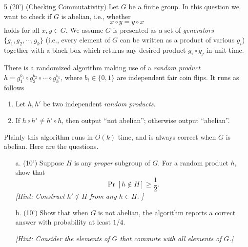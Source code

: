 
\begin{question}{5 (20') (Checking Commutativity)}
	Let $G$ be a finite group. In this question we want to check if $G$ is abelian, i.e., whether
	$$
	x\circ y=y\circ x
	$$
	holds for all $x,y\in G$. We assume $G$ is presented as a set of \textit{generators} $\{g_1,g_2,\cdots,g_k\}$ (i.e., every element of $G$ can be written as a product of various $g_i$) together with a black box which returns any desired product $g_i\circ g_j$ in unit time.
	
	There is a randomized algorithm making use of a \textit{random product} $h=g_1^{b_1}\circ g_2^{b_2}\circ\cdots\circ g_k^{b_k}$, where $b_i\in\{0,1\}$ are independent fair coin flips. It runs as follows
	\begin{enumerate}
		\item Let $h,h'$ be two independent \textit{random products}.
		\item If $h\circ h'\neq h'\circ h$, then output ``not abelian''; otherwise output ``abelian''.
	\end{enumerate}
	
	Plainly this algorithm runs in $O(k)$ time, and is always correct when $G$ is abelian. Here are the questions.
	\begin{itemize}
		\item[a. (10')] Suppose $H$ is any \textit{proper} subgroup of $G$. For a random product $h$, show that 
		$$
		\Pr[h\notin H]\geq\frac{1}{2}.
		$$
		\textit{[Hint: Construct $h'\notin H$ from any $h\in H$. ]}
		
		\item[b. (10')] Show that when $G$ is not abelian, the algorithm reports a correct answer with probability at least $1/4$. 
		
		\textit{[Hint: Consider the elements of $G$ that commute with all elements of $G$.]}
	\end{itemize}
\end{question}

